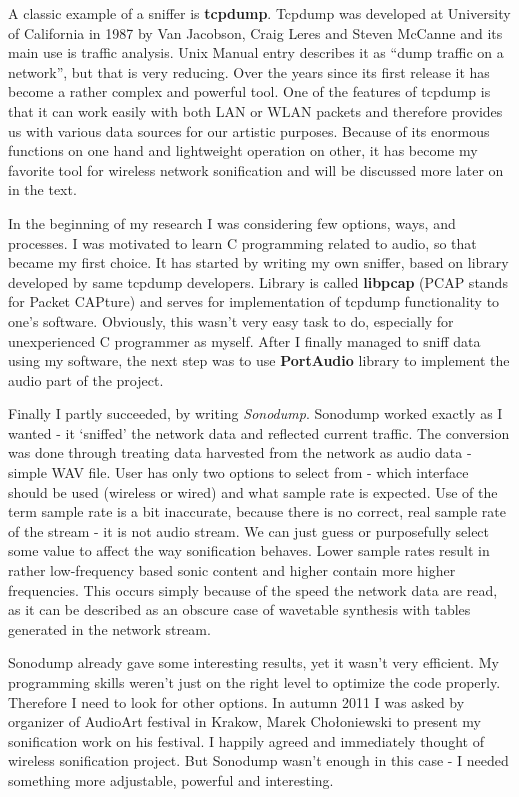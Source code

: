 \documentclass[11pt,a4paper,oneside]{report}
\begin{document}
A classic example of a sniffer is \textbf{tcpdump}. Tcpdump was developed at University of California in 1987 by Van Jacobson, Craig Leres and Steven McCanne and its main use is traffic analysis. Unix Manual entry describes it as ``dump traffic on a network'', but that is very reducing. Over the years since its first release it has become a rather complex and powerful tool. One of the features of tcpdump is that it can work easily with both LAN or WLAN packets and therefore provides us with various data sources for our artistic purposes. Because of its enormous functions on one hand and lightweight operation on other, it has become my favorite tool for wireless network sonification and will be discussed more later on in the text.

In the beginning of my research I was considering few options, ways, and processes. I was motivated to learn C programming related to audio, so that became my first choice. It has started by writing my own sniffer, based on library developed by same tcpdump developers. Library is called \textbf{libpcap} (PCAP stands for Packet CAPture) and serves for implementation of tcpdump functionality to one's software. Obviously, this wasn't very easy task to do, especially for unexperienced C programmer as myself. After I finally managed to sniff data using my software, the next step was to use \textbf{PortAudio} library to implement the audio part of the project.

Finally I partly succeeded, by writing \emph{Sonodump}. Sonodump worked exactly as I wanted - it `sniffed' the network data and reflected current traffic. The conversion was done through treating data harvested from the network as audio data - simple WAV file. User has only two options to select from - which interface should be used (wireless or wired) and what sample rate is expected. Use of the term sample rate is a bit inaccurate, because there is no correct, real sample rate of the stream - it is not audio stream. We can just guess or purposefully select some value to affect the way sonification behaves. Lower sample rates result in rather low-frequency based sonic content and higher contain more higher frequencies. This occurs simply because of the speed the network data are read, as it can be described as an obscure case of wavetable synthesis with tables generated in the network stream.

Sonodump already gave some interesting results, yet it wasn't very efficient. My programming skills weren't just on the right level to optimize the code properly. Therefore I need to look for other options. In autumn 2011 I was asked by organizer of AudioArt festival in Krakow, Marek Chołoniewski to present my sonification work on his festival. I happily agreed and immediately thought of wireless sonification project. But Sonodump wasn't enough in this case - I needed something more adjustable, powerful and interesting.
\end{document}
